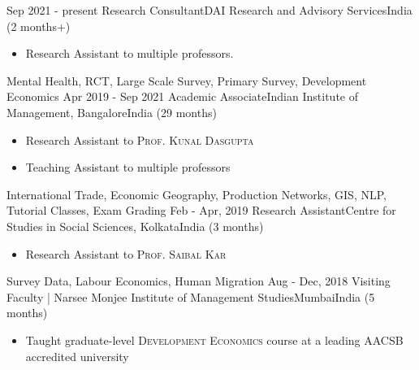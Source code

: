 %
%
%


\begin{experiences}

  \texperience
    {Sep 2021 - present}   {Research Consultant}{DAI Research and Advisory Services}{India}
    {(2 months+)} {
                      \begin{itemize}
                        \item Research Assistant to multiple professors.                    
                      \end{itemize}
                    }
                    {Mental Health, RCT, Large Scale Survey, Primary Survey, Development Economics}
\emptySeparator
  \texperience
    {Apr 2019 - Sep 2021}   {Academic Associate}{Indian Institute of Management, Bangalore}{India}
    {(29 months)} {
                      \begin{itemize}
                        \item Research Assistant to \textsc{Prof. Kunal Dasgupta}                    
                        \item Teaching Assistant to multiple professors                    
                      \end{itemize}
                    }
                    {International Trade, Economic Geography, Production Networks, GIS, NLP, Tutorial Classes, Exam Grading}
\emptySeparator
  \texperience
    {Feb - Apr, 2019}   {Research Assistant}{Centre for Studies in Social Sciences, Kolkata}{India}
    {(3 months)} {
                      \begin{itemize}
                        \item Research Assistant to \textsc{Prof. Saibal Kar}
                      \end{itemize}
                    }
                    {Survey Data, Labour Economics, Human Migration}
\emptySeparator
  \texperience
    {Aug - Dec, 2018}   {Visiting Faculty | Narsee Monjee Institute of Management Studies}{Mumbai}{India}
    {(5 months)} {
                      \begin{itemize}
                        \item Taught graduate-level \textsc{Development Economics} course at a leading AACSB accredited university

\end{itemize}}
\end{experiences}
